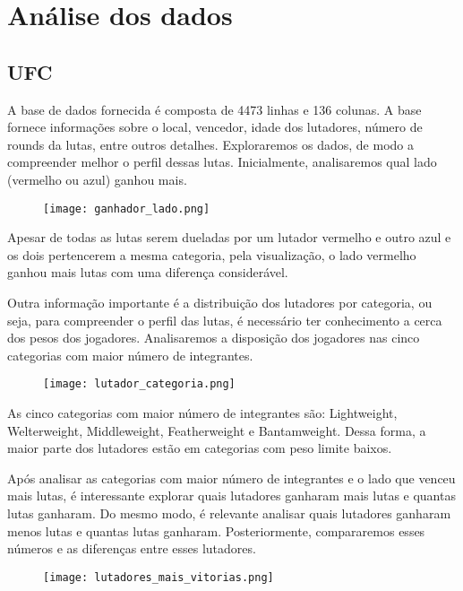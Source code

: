 \documentclass{article}
\begin{document}
\section{Análise dos dados}
\subsection{UFC}
A base de dados fornecida é composta de 4473 linhas e 136 colunas. A base fornece informações sobre o local, vencedor, idade dos lutadores, número de rounds da lutas, entre outros detalhes. Exploraremos os dados, de modo a compreender melhor o perfil dessas lutas. Inicialmente, analisaremos qual lado (vermelho ou azul) ganhou mais.

\begin{figure}[H] 
    \centering 
    \texttt{[image: ganhador\_lado.png]} 
\end{figure}

\par Apesar de todas as lutas serem dueladas por um lutador vermelho e outro azul e os dois pertencerem a mesma categoria, pela visualização, o lado vermelho ganhou mais lutas com uma diferença considerável.
\par Outra informação importante é a distribuição dos lutadores por categoria, ou seja, para compreender o perfil das lutas, é necessário  ter conhecimento a cerca dos pesos dos jogadores. Analisaremos a disposição dos jogadores nas cinco categorias com maior número de integrantes.
    
\begin{figure}[H] 
    \centering 
    \texttt{[image: lutador\_categoria.png]} 
\end{figure}

\par As cinco categorias com maior número de integrantes são: Lightweight, Welterweight, Middleweight, Featherweight e Bantamweight. Dessa forma, a maior parte dos lutadores estão em categorias com peso limite baixos.
\par Após analisar as categorias com maior número de integrantes e o lado que venceu mais lutas, é interessante explorar quais lutadores ganharam mais lutas e quantas lutas ganharam. Do mesmo modo, é relevante analisar quais lutadores ganharam menos lutas e quantas lutas ganharam. Posteriormente, compararemos esses números e as diferenças entre esses lutadores.
    
\begin{figure}[H] 
    \centering 
    \texttt{[image: lutadores\_mais\_vitorias.png]} 
\end{figure}
  
\end{document}
